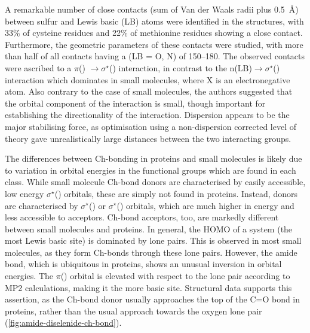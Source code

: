 \begin{refsection}
A remarkable number of close contacts (sum of Van der Waals radii plus 0.5~\AA) between sulfur and Lewis basic (LB) atoms were identified in the structures, with 33\% of cysteine residues and 22\% of methionine residues showing a close contact.
Furthermore, the geometric parameters of these contacts were studied, with more than half of all contacts having a  (LB = O, N) of 150--180\degree.
The observed contacts were ascribed to a $ \pi $() $ \rightarrow \sigma^{\star} $() interaction, in contrast to the n(LB)$ \rightarrow \sigma^{\star} $() interaction which dominates in small molecules, where X is an electronegative atom.
Also contrary to the case of small molecules, the authors suggested that the orbital component of the interaction is small, though important for establishing the directionality of the interaction.
Dispersion appears to be the major stabilising force, as optimisation using a non-dispersion corrected level of theory gave unrealistically large distances between the two interacting groups.

The differences between Ch-bonding in proteins and small molecules is likely due to variation in orbital energies in the functional groups which are found in each class.
While small molecule Ch-bond donors are characterised by easily accessible, low energy $ \sigma^{\star} $() orbitals, these are simply not found in proteins.
Instead, donors are characterised by $ \sigma^{\star} $() or $ \sigma^{\star} $() orbitals, which are much higher in energy and less accessible to acceptors.
Ch-bond acceptors, too, are markedly different between small molecules and proteins.
In general, the HOMO of a system (the most Lewis basic site) is dominated by lone pairs.
This is observed in most small molecules, as they form Ch-bonds through these lone pairs.
However, the amide bond, which is ubiquitous in proteins, shows an unusual inversion in orbital energies.
The $ \pi $() orbital is elevated with respect to the lone pair according to MP2 calculations, making it the more basic site.
Structural data supports this assertion, as the Ch-bond donor usually approaches the top of the C=O bond in proteins, rather than the usual approach towards the oxygen lone pair (\cref{fig:amide-diselenide-ch-bond}).\autocite{Iwaoka2012}


\end{refsection}
